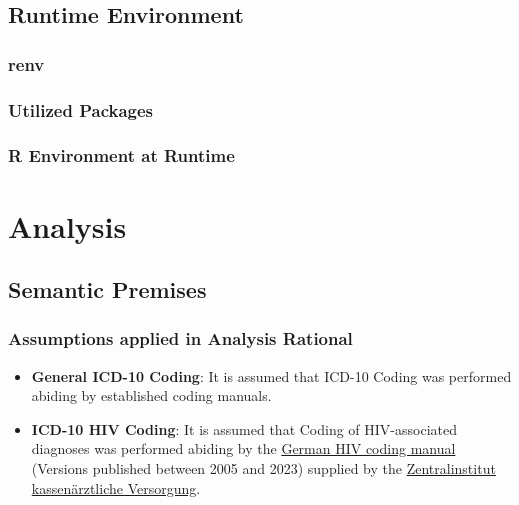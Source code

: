 \documentclass[
  letterpaper,
  DIV=11,
  numbers=noendperiod]{scrreprt}
\begin{document}
\hypertarget{runtime-environment}{%
\chapter{Runtime Environment}\label{runtime-environment}}

\hypertarget{renv}{%
\section{renv}\label{renv}}

\hypertarget{utilized-packages}{%
\section{Utilized Packages}\label{utilized-packages}}

\hypertarget{r-environment-at-runtime}{%
\section{R Environment at Runtime}\label{r-environment-at-runtime}}

\part{Analysis}

\hypertarget{semantic-premises}{%
\chapter{Semantic Premises}\label{semantic-premises}}

\hfill\break

\hypertarget{assumptions-applied-in-analysis-rational}{%
\section{Assumptions applied in Analysis
Rational}\label{assumptions-applied-in-analysis-rational}}

\begin{itemize}
\item
  \textbf{General ICD-10 Coding}: It is assumed that ICD-10 Coding was
  performed abiding by established coding manuals.
\item
  \textbf{ICD-10 HIV Coding}: It is assumed that Coding of
  HIV-associated diagnoses was performed abiding by the
  \href{https://www.zi.de/themen/medizin/kodierung/zi-manuale}{German
  HIV coding manual} (Versions published between 2005 and 2023) supplied
  by the \href{https://www.zi.de/}{Zentralinstitut kassenärztliche
  Versorgung}.
\end{itemize}
\end{document}
